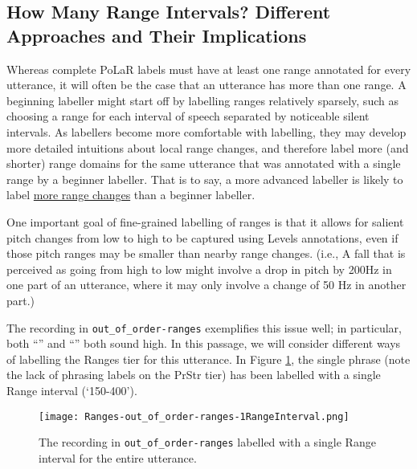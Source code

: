 \subsection{How Many Range Intervals? Different Approaches and Their Implications}\label{sec:how-many-range-intervals-different-approaches-and-their-implications}

Whereas complete PoLaR labels must have at least one range annotated for every utterance, it will often be the case that an utterance has more than one range. A beginning labeller might start off by labelling ranges relatively sparsely, such as choosing a range for each interval of speech separated by noticeable silent intervals. As labellers become more comfortable with labelling, they may develop more detailed intuitions about local range changes, and therefore label more (and shorter) range domains for the same utterance that was annotated with a single range by a beginner labeller. That is to say, a more advanced labeller is likely to label \uline{more range changes} than a beginner labeller.

One important goal of fine-grained labelling of ranges is that it allows for salient pitch changes from low to high to be captured using Levels annotations, even if those pitch ranges may be smaller than nearby range changes. (i.e., A fall that is perceived as going from high to low might involve a drop in pitch by 200Hz in one part of an utterance, where it may only involve a change of 50 Hz in another part.)

The recording in \texttt{out\_of\_order-ranges} exemplifies this issue well; in particular, both “” and “” both sound high.  In this passage, we will consider different ways of labelling the Ranges tier for this utterance. In Figure \ref{fig:out_of_order-ranges 1range Ranges Adv}, the single phrase (note the lack of phrasing labels on the PrStr tier) has been labelled with a single Range interval (‘150-400’).

\begin{figure}[H]
\centering
%
\texttt{[image: Ranges-out\_of\_order-ranges-1RangeInterval.png]}
%
\caption[A single Range interval for the entire utterance.]{The recording in \texttt{out\_of\_order-ranges} labelled with a single Range interval for the entire utterance.%
\label{fig:out_of_order-ranges 1range Ranges Adv}%
}
\end{figure}

